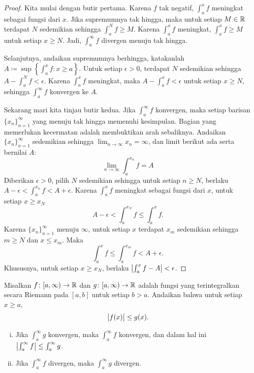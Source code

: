 \begin{proof}
Kita mulai dengan butir pertama.
Karena $f$ tak negatif,
$\int_a^x f$ meningkat sebagai fungsi dari $x$.
Jika supremumnya tak hingga, maka untuk setiap $M \in {\mathbb{R}}$
terdapat $N$ sedemikian sehingga $\int_a^N f \geq M$.  Karena $\int_a^x f$
meningkat, $\int_a^x f \geq M$ untuk setiap $x \geq N$.  Jadi,
$\int_a^\infty f$ divergen menuju tak hingga.

Selanjutnya, andaikan supremumnya berhingga, katakanlah
$A \coloneqq \sup \left\{ \int_a^x f : x \geq a \right\}$.
Untuk setiap $\epsilon > 0$, terdapat $N$ sedemikian sehingga
$A - \int_a^N f < \epsilon$.  Karena $\int_a^x f$ meningkat,
maka
$A - \int_a^x f < \epsilon$ untuk setiap $x \geq N$, sehingga
$\int_a^\infty f$ konvergen ke $A$.

Sekarang mari kita tinjau butir kedua.
Jika $\int_a^\infty f$ konvergen, maka setiap barisan $\{ x_n \}_{n=1}^\infty$ yang menuju
tak hingga memenuhi kesimpulan.  Bagian yang memerlukan kecermatan adalah
membuktikan arah sebaliknya.  Andaikan $\{ x_n \}_{n=1}^\infty$ sedemikian sehingga
$\lim_{n\to\infty} x_n = \infty$, dan limit berikut ada serta bernilai $A$:
\begin{equation*}
\lim_{n\to\infty} \int_a^{x_n} f = A
\end{equation*}
Diberikan $\epsilon > 0$, pilih $N$ sedemikian sehingga untuk
setiap $n \geq N$, berlaku
$A - \epsilon < \int_a^{x_n} f < A + \epsilon$.
Karena $\int_a^x f$ meningkat sebagai fungsi dari $x$, untuk setiap
$x \geq x_N$
\begin{equation*}
A - \epsilon < \int_a^{x_N} f \leq \int_a^x f .
\end{equation*}
Karena $\{ x_n \}_{n=1}^\infty$ menuju $\infty$, untuk setiap 
$x$ terdapat $x_m$ sedemikian sehingga $m \geq N$ dan $x \leq x_m$.  Maka
\begin{equation*}
\int_a^{x} f \leq \int_a^{x_m} f < A + \epsilon .
\end{equation*}
Khususnya, untuk setiap $x \geq x_N$, berlaku
$\left\lvert {\int_a^{x} f - A} \right\rvert < \epsilon$.
\end{proof}

\begin{prop}%
Misalkan
$f \colon [a,\infty) \to {\mathbb{R}}$ dan
$g \colon [a,\infty) \to {\mathbb{R}}$ adalah fungsi
yang terintegralkan secara Riemann pada $[a,b]$ untuk setiap $b > a$.   Andaikan
bahwa untuk setiap $x \geq a$,
\begin{equation*}
\bigl\lvert {f(x)} \bigr\rvert \leq g(x) .
\end{equation*}
\begin{enumerate}[(i)]
\item Jika $\int_a^\infty g$ konvergen, maka $\int_a^\infty f$ konvergen,
dan dalam hal ini 
$\left\lvert {\int_a^\infty f} \right\rvert \leq \int_a^\infty g$.
\item Jika $\int_a^\infty f$ divergen, maka $\int_a^\infty g$ divergen.
\end{enumerate}
\end{prop}

